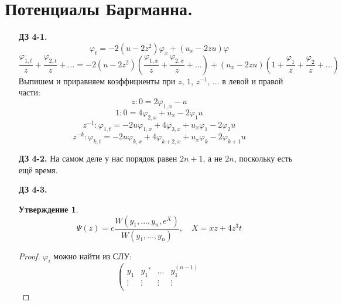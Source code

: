 \documentclass[12pt]{article}
\newtheorem{utv}{Утверждение}
\theoremstyle{definition}
\begin{document}
\section{Потенциалы Баргманна.}
\begin{itemize}
    \item[\textbf{ДЗ 4-1.}]
    \begin{equation}
        \varphi_t=-2(u-2z^2)\varphi_x+(u_x-2zu)\varphi
    \end{equation}
    \begin{equation}
        \frac{\varphi_{1,t}}{z}+\frac{\varphi_{2,t}}{z}+...=-2(u-2z^2)\left(\frac{\varphi_{1,x}}{z}+\frac{\varphi_{2,x}}{z}+...\right)+(u_x-2zu)\left(1+\frac{\varphi_1}{z}+\frac{\varphi_2}{z}+...\right)
    \end{equation}
    Выпишем и приравняем коэффициенты при $z$, $1$, $z^{-1}$, ... в левой и правой части:
    \begin{equation}
        z: 0=2\varphi_{1,x}-u
    \end{equation}
    \begin{equation}
        1: 0=4\varphi_{2,x}+u_x-2\varphi_1u
    \end{equation}
    \begin{equation}
        z^{-1}: \varphi_{1,t}=-2u\varphi_{1,x}+4\varphi_{3,x}+u_x\varphi_1-2\varphi_2u
    \end{equation}
    \begin{equation}
        z^{-k}: \varphi_{k,t}=-2u\varphi_{k,x}+4\varphi_{k+2,x}+u_x\varphi_k-2\varphi_{k+1}u
    \end{equation}
    \item[\textbf{ДЗ 4-2.}]
    На самом деле у нас порядок равен $2n+1$, а не $2n$, поскольку есть ещё время. 
    \item[\textbf{ДЗ 4-3.}]
    \begin{utv}
        \begin{equation}
            \Psi(z)=c\frac{W(y_1,...,y_n,e^X)}{W(y_1,...,y_n)}, \quad X=xz+4z^3t
        \end{equation}
        \end{utv}
        \begin{proof}
        $\varphi_i$ можно найти из СЛУ:
        \begin{equation}
            \left(
            \begin{array}{cccc}
             y_1 & y_1' & \ldots & y_1^{(n-1)}\\
             \vdots & \vdots & \vdots & \vdots\\

\end{array}
\end{equation}
\end{proof}
\end{itemize}
\end{document}
